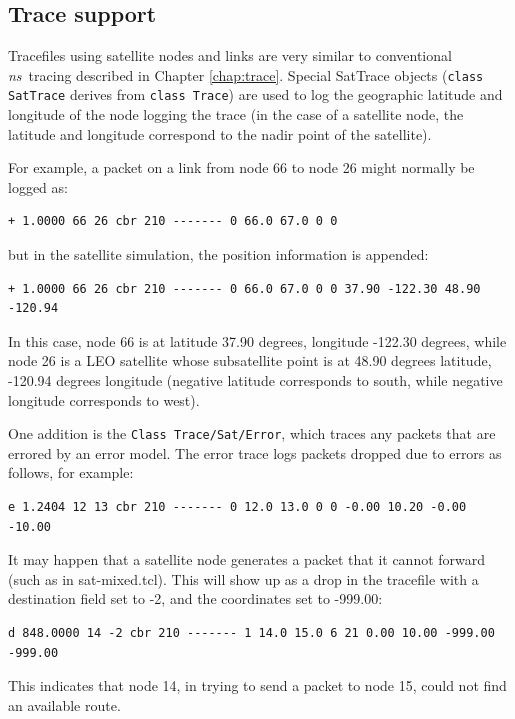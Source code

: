 \subsection{Trace support}
\label{sec:satellite/usage/trace}

Tracefiles using satellite nodes and links are very similar to conventional
\emph{ns}~tracing described in Chapter \ref{chap:trace}.  Special SatTrace objects
({\tt class SatTrace} derives from {\tt class Trace}) are used
to log the geographic latitude and longitude of the node logging the trace
(in the case of a satellite node, the latitude and longitude correspond
to the nadir point of the satellite).

For example, a packet on a link from node 66 to node 26 might normally be
logged as:  
\begin{verbatim}
+ 1.0000 66 26 cbr 210 ------- 0 66.0 67.0 0 0 
\end{verbatim}
but in the satellite simulation, the position information is appended:
\begin{verbatim}
+ 1.0000 66 26 cbr 210 ------- 0 66.0 67.0 0 0 37.90 -122.30 48.90 -120.94
\end{verbatim}
In this case, node 66 is at latitude 37.90 degrees, longitude -122.30
degrees, while node 26 is a LEO satellite whose subsatellite
point is at 48.90 degrees latitude, -120.94 degrees longitude (negative
latitude corresponds to south, while negative longitude corresponds to
west).

One addition is the {\tt Class Trace/Sat/Error}, which traces any packets
that are errored by an error model.  The error trace logs packets dropped
due to errors as follows, for example:  
\begin{verbatim}
e 1.2404 12 13 cbr 210 ------- 0 12.0 13.0 0 0 -0.00 10.20 -0.00 -10.00
\end{verbatim}

It may happen that a satellite node generates a packet that it cannot
forward (such as in sat-mixed.tcl).  This will show up as a drop in
the tracefile with a destination field set to -2, and the coordinates
set to -999.00:
\begin{verbatim}
d 848.0000 14 -2 cbr 210 ------- 1 14.0 15.0 6 21 0.00 10.00 -999.00 -999.00 
\end{verbatim}
This indicates that node 14, in trying to send a packet to node 15, could
not find an available route.

